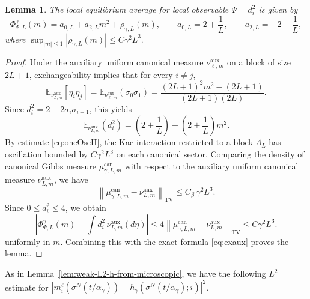 \documentclass{article}
\newtheorem{lemma}{Lemma}
\begin{document}
\begin{lemma}\label{lem:clean-explicit-dsquare}
The local equilibrium average for local observable \(\Psi=d_i^2\) is given by
\[
\Phi_{\Psi,L}^{\gamma}(m)
=
a_{0,L}+a_{2,L}m^2+\rho_{\gamma,L}(m),
\qquad
a_{0,L}=2+\frac1L,\qquad
a_{2,L}=-2-\frac1L,
\]
where
\(
\sup_{|m|\le1}|\rho_{\gamma,L}(m)|
\le C\gamma^2L^3 .
\)
\end{lemma}

\begin{proof}
Under the auxiliary uniform canonical measure \(\nu_{\ell,m}^{\mathrm{aux}}\) on a block of size \(2L+1\), exchangeability implies that for every \(i\neq j\),
\[
\mathbb E_{\nu_{L,m}^{\mathrm{aux}}}[\eta_i\eta_j]=\mathbb E_{\nu_{\ell,m}^{\mathrm{aux}}}(\sigma_0\sigma_{1})
=
\frac{(2L+1)^2m^2-(2L+1)}{(2L+1)(2L)}.
\]
Since \(d_i^2=2-2\sigma_i\sigma_{i+1}\), this yields
\begin{equation}\label{eq:exaux}
    \mathbb E_{\nu_{L,m}^{\mathrm{aux}}}(d_i^2) = \left(2+\frac1L\right) -\left(2+\frac1L\right)m^2.
\end{equation}
By estimate \eqref{eq:oneOscH}, the Kac interaction restricted to a block $\Lambda_L$ has oscillation bounded by \(C\gamma^2L^3\) on each canonical sector.  
Comparing the density of canonical Gibbs measure $\mu_{\gamma,L,m}^{\mathrm{can}}$ with respect to the auxiliary uniform canonical measure $\nu_{L,m}^{\mathrm{aux}}$, we have
\[
\left\|
\mu_{\gamma,L,m}^{\mathrm{can}}-\nu_{L,m}^{\mathrm{aux}}
\right\|_{\mathrm{TV}}
\le
C_\beta\,\gamma^2L^3.
\]
Since \(0\le d_i^2\le 4\), we obtain
\[
\left|
\Phi_{\Psi,L}^{\gamma}(m)
-
\int d_i^2\,\nu_{L,m}^{\mathrm{aux}}(d\eta)
\right|
\le
4\left\|
\mu_{\gamma,L,m}^{\mathrm{can}}-\nu_{L,m}^{\mathrm{aux}}
\right\|_{\mathrm{TV}}
\le
C \gamma^2L^3.
\]
uniformly in \(m\).
Combining this with the exact formula \eqref{eq:exaux} proves the lemma.
\end{proof}

As in Lemma~\ref{lem:weak-L2-h-from-microscopic}, we have the following \(L^2\) estimate for $|m_i^\ell(\sigma^N(t/\alpha_\gamma))-h_\gamma(\sigma^N(t/\alpha_\gamma);i)|^2$.
\end{document}
